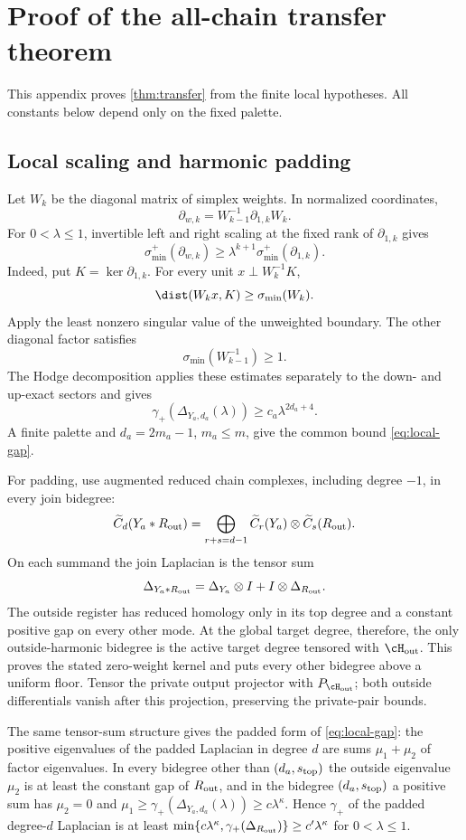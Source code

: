 \section{Proof of the all-chain transfer theorem}
\label{app:transfer-proof}

This appendix proves \cref{thm:transfer} from the finite local hypotheses. All constants below depend only on the fixed palette.

\subsection{Local scaling and harmonic padding}
\label{app:local-padding}

Let \(W_k\) be the diagonal matrix of simplex weights.  In normalized
coordinates,
\[
\partial_{w,k}=W_{k-1}^{-1}\partial_{1,k}W_k.
\]
For \(0<\lambda\le1\), invertible left and right scaling at the fixed rank of
\(\partial_{1,k}\) gives
\[
\sigma_{\min}^+(\partial_{w,k})
\ge\lambda^{k+1}\sigma_{\min}^+(\partial_{1,k}).
\]
Indeed, put \(K=\ker\partial_{1,k}\).  For every unit
\(x\perp W_k^{-1}K\),
\[
\dist(W_kx,K)\ge\sigma_{\min}(W_k).
\]
Apply the least nonzero singular value of the unweighted boundary.  The other
diagonal factor satisfies
\[
\sigma_{\min}(W_{k-1}^{-1})\ge1.
\]
The Hodge decomposition applies these estimates separately to the down- and
up-exact sectors and gives
\[
\gamma_+(\Delta_{Y_a,d_a}(\lambda))
\ge c_a\lambda^{2d_a+4}.
\]
A finite palette and \(d_a=2m_a-1\), \(m_a\le m\), give the common bound
\cref{eq:local-gap}.

For padding, use augmented reduced chain complexes, including degree \(-1\),
in every join bidegree:
\[
\widetilde C_d(Y_a*R_{\rm out})
=\bigoplus_{r+s=d-1}
\widetilde C_r(Y_a)\otimes\widetilde C_s(R_{\rm out}).
\]
On each summand the join Laplacian is the tensor sum
\[
\Delta_{Y_a*R_{\rm out}}
=\Delta_{Y_a}\otimes I+I\otimes\Delta_{R_{\rm out}}.
\]
The outside register has reduced homology only in its top degree and a
constant positive gap on every other mode.  At the global target degree,
therefore, the only outside-harmonic bidegree is the active target degree
tensored with \(\cH_{\rm out}\).  This proves the stated zero-weight kernel
and puts every other bidegree above a uniform floor.  Tensor the private
output projector with \(P_{\cH_{\rm out}}\); both outside differentials vanish
after this projection, preserving the private-pair bounds.

The same tensor-sum structure gives the padded form of
\cref{eq:local-gap}: the positive eigenvalues of the padded Laplacian in
degree \(d\) are sums \(\mu_1+\mu_2\) of factor eigenvalues.  In every
bidegree other than \((d_a,s_{\rm top})\) the outside eigenvalue \(\mu_2\) is
at least the constant gap of \(R_{\rm out}\), and in the bidegree
\((d_a,s_{\rm top})\) a positive sum has \(\mu_2=0\) and
\(\mu_1\ge\gamma_+(\Delta_{Y_a,d_a}(\lambda))\ge c\lambda^\kappa\).  Hence
\(\gamma_+\) of the padded degree-\(d\) Laplacian is at least
\(\min\{c\lambda^\kappa,\gamma_+(\Delta_{R_{\rm out}})\}\ge c'\lambda^\kappa\)
for \(0<\lambda\le1\).

